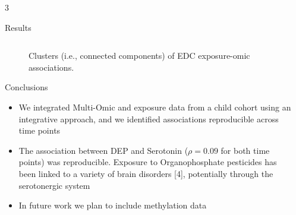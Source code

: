 \documentclass[final]{beamer}
\newlength{\sepwidth}
\newlength{\colwidth}
\newcommand{\separatorcolumn}{\begin{column}{\sepwidth}\end{column}}
\begin{document}
\begin{frame}[t]
\begin{columns}[t]
\begin{column}{3\colwidth}
\begin{block}{Results}
\begin{columns}
\begin{column}{0.8\textwidth}
		\begin{figure}
				\centering
				\qquad
				\qquad
				\caption{Clusters (i.e., connected components) of EDC exposure-omic associations.}
				\label{fig:ccs}
		\end{figure}
		
		\begin{block}{Conclusions}
			\begin{itemize}
				\item We integrated Multi-Omic and exposure data from a child cohort using an integrative approach, and we identified associations reproducible across time points
				\item The association between DEP and Serotonin ($\rho=0.09$ for both time points) was reproducible. Exposure to Organophosphate pesticides has been linked to a variety of brain disorders [4], potentially through the serotonergic system
				\item In future work we plan to include methylation data
			\end{itemize}
		\end{block}
		
	\end{column}
  
  \end{columns}
  \end{block}

\end{column}

\separatorcolumn
\end{columns}
\end{frame}
\end{document}

